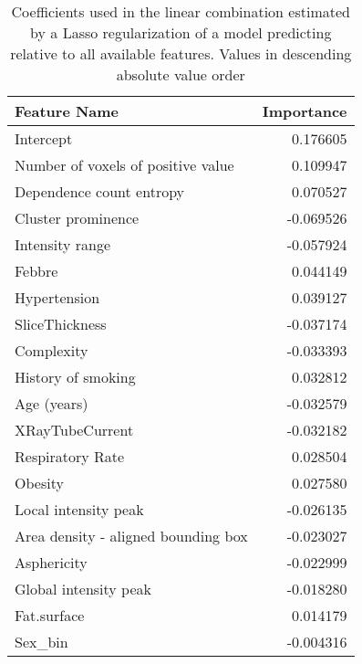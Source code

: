 \begin{table}
	\caption{Coefficients used in the linear combination estimated by a Lasso regularization of a model predicting \icu relative to all available features. Values in descending absolute value order\label{tab:ParamAll}}
		\centering
		\begin{tabular}{lr}
		\toprule
		Feature Name &   Importance \\
		\midrule
		Intercept                           &                      0.176605 \\
		Number of voxels of positive value  &                      0.109947 \\
		Dependence count entropy            &                      0.070527 \\
		Cluster prominence                  &                     -0.069526 \\
		Intensity range                     &                     -0.057924 \\
		Febbre                              &                      0.044149 \\
		Hypertension                        &                      0.039127 \\
		SliceThickness                      &                     -0.037174 \\
		Complexity                          &                     -0.033393 \\
		History of smoking                  &                      0.032812 \\
		Age (years)                         &                     -0.032579 \\
		XRayTubeCurrent                     &                     -0.032182 \\
		Respiratory Rate                    &                      0.028504 \\
		Obesity                             &                      0.027580 \\
		Local intensity peak                &                     -0.026135 \\
		Area density - aligned bounding box &                     -0.023027 \\
		Asphericity                         &                     -0.022999 \\
		Global intensity peak               &                     -0.018280 \\
		Fat.surface                         &                      0.014179 \\
		Sex\_bin                             &                     -0.004316 \\

\end{tabular}
\end{table}
